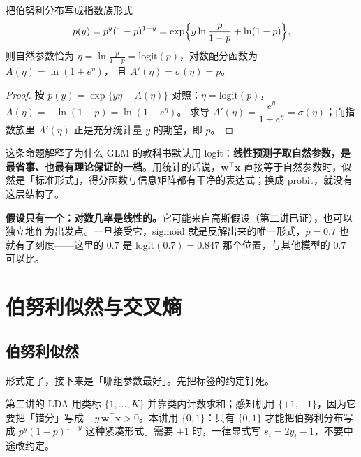 \documentclass[11pt,a4paper,fontset=windows,zihao=-4]{ctexart}
\newcommand{\bw}{\mathbf{w}}
\newcommand{\bx}{\mathbf{x}}
\newcommand{\tp}{^{\top}}
\begin{document}
\begin{prop}
把伯努利分布写成指数族形式
\begin{equation}
  p(y)=p^{y}(1-p)^{1-y}=\exp\Bigl\{y\ln\frac{p}{1-p}+\ln(1-p)\Bigr\},
\end{equation}
则自然参数恰为 $\eta=\ln\frac{p}{1-p}=\mathrm{logit}(p)$，对数配分函数为 $A(\eta)=\ln(1+e^{\eta})$，
且 $A'(\eta)=\sigma(\eta)=p$。
\end{prop}

\begin{proof}
按 $p(y)=\exp\{y\eta-A(\eta)\}$ 对照：$\eta=\mathrm{logit}(p)$，$A(\eta)=-\ln(1-p)=\ln(1+e^{\eta})$。
求导 $A'(\eta)=\dfrac{e^{\eta}}{1+e^{\eta}}=\sigma(\eta)$；而指数族里 $A'(\eta)$ 正是充分统计量 $y$ 的期望，即 $p$。
\end{proof}

这条命题解释了为什么 GLM 的教科书默认用 logit：\textbf{线性预测子取自然参数，是最省事、也最有理论保证的一档}。用统计的话说，$\bw\tp\bx$ 直接等于自然参数时，似然是「标准形式」，得分函数与信息矩阵都有干净的表达式；换成 probit，就没有这层结构了。

\begin{keybox}[本节结论]
\textbf{假设只有一个：对数几率是线性的。}它可能来自高斯假设（第二讲已证），也可以独立地作为出发点。一旦接受它，sigmoid 就是反解出来的唯一形式，$p=0.7$ 也就有了刻度——这里的 $0.7$ 是 $\mathrm{logit}(0.7)=0.847$ 那个位置，与其他模型的 $0.7$ 可以比。
\end{keybox}


\section{伯努利似然与交叉熵}

\subsection{伯努利似然}

形式定了，接下来是「哪组参数最好」。先把标签的约定钉死。

\begin{warn}[三套标签不能混]
第二讲的 LDA 用类标 $\{1,\dots,K\}$ 并靠类内计数求和；感知机用 $\{+1,-1\}$，因为它要把「错分」写成 $-y\,\bw\tp\bx>0$。本讲用 $\{0,1\}$：只有 $\{0,1\}$ 才能把伯努利分布写成 $p^{y}(1-p)^{1-y}$ 这种紧凑形式。需要 $\pm1$ 时，一律显式写 $s_i=2y_i-1$，不要中途改约定。
\end{warn}
\end{document}
